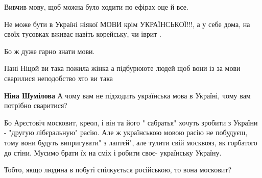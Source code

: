 \begin{itemize}
Вивчив мову, щоб можна було ходити по ефірах оце й все.

Не може бути в Україні ніякої МОВИ крім УКРАЇНСЬКОЇ!!!, а у себе дома, на своїх
тусовках вживає навіть корейську, чи іврит .

Бо ж дуже гарно знати мови.


 

Пані Ніцой ви така пожила жінка а підбурююте людей щоб вони із за мови
сварилися неподобство хто ви така

\begin{itemize}
 
\textbf{Ніна Шумілова} А чому вам не підходить українська мова в Україні, чому вам потрібно сваритися?
\end{itemize}

 

Бо Арєстовіч московит, креол, і він та його " сабратья" хочуть зробити з
України - "другую лібєральную" расію. Але ж українською мовою расію не
побудуєш, тому вони будуть випригувати" з лаптєй", але тулити свій москвояз, як
горбатого до стіни. Мусимо брати їх на сміх і робити своє- українську Україну.


 

Тобто, якщо людина в побуті спілкується російською, то вона московит?

\begin{itemize}
 

\end{itemize}
\end{itemize}
